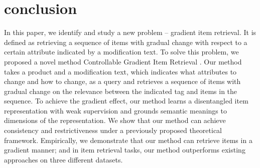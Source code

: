 \section{conclusion}
\label{sec:conclusion}
In this paper, we identify and study a new problem -- gradient item retrieval. It is defined as retrieving a sequence of items with gradual change with respect to a certain attribute indicated by a modification text. To solve this problem, we proposed a novel method Controllable Gradient Item Retrieval \CGIR. Our method takes a product and a modification text, which indicates what attributes to change and how to change, as a query and retrieves a sequence of items with gradual change on the relevance between the indicated tag and items in the sequence. To achieve the gradient effect, our method learns a disentangled item representation with weak supervision and grounds semantic meanings to dimensions of the representation. We show that our method can achieve consistency and restrictiveness under a previously proposed theoretical framework. Empirically, we demonstrate that our method can retrieve items in a gradient manner; and in item retrieval tasks, our method outperforms existing approaches on three different datasets.